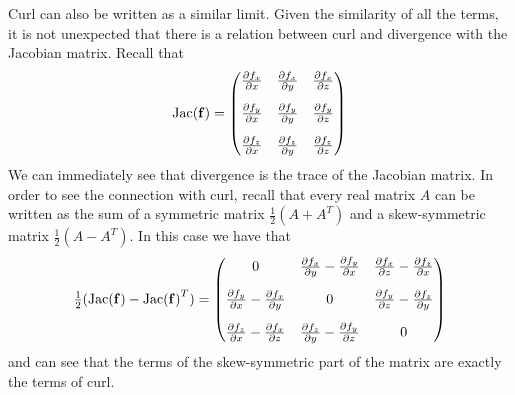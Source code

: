 Curl can also be written as a similar limit.
Given the similarity of all the terms, it is not unexpected that there is a relation between curl and divergence with the Jacobian matrix.
Recall that
\[
    \operatorname{Jac}(\mathbf{f}) =
    \begin{pmatrix}
        \frac{\partial f_x}{\partial x}
         & \frac{\partial f_x}{\partial y}
         & \frac{\partial f_x}{\partial z} \\[1em]
        \frac{\partial f_y}{\partial x}
         & \frac{\partial f_y}{\partial y}
         & \frac{\partial f_y}{\partial z} \\[1em]
        \frac{\partial f_z}{\partial x}
         & \frac{\partial f_z}{\partial y}
         & \frac{\partial f_z}{\partial z}
    \end{pmatrix}
\]
We can immediately see that divergence is the trace of the Jacobian matrix.
In order to see the connection with curl, recall that every real matrix \(A\) can be written as the sum of a symmetric matrix \(\frac{1}{2}(A + A^{T})\) and a skew-symmetric matrix \(\frac{1}{2}(A - A^{T})\).
In this case we have that
\[
    \tfrac{1}{2}(\operatorname{Jac}(\mathbf{f}) - {\operatorname{Jac}(\mathbf{f})}^{T}) =
    \begin{pmatrix}
        0
         & \frac{\partial f_x}{\partial y} - \frac{\partial f_y}{\partial x}
         & \frac{\partial f_x}{\partial z} - \frac{\partial f_z}{\partial x}
        \\[1em]
        \frac{\partial f_y}{\partial x} - \frac{\partial f_x}{\partial y}
         & 0
         & \frac{\partial f_y}{\partial z} - \frac{\partial f_z}{\partial y}
        \\[1em]
        \frac{\partial f_z}{\partial x}  - \frac{\partial f_x}{\partial z}
         & \frac{\partial f_z}{\partial y}  - \frac{\partial f_y}{\partial z}
         & 0
    \end{pmatrix}
\]
and can see that the terms of the skew-symmetric part of the matrix are exactly the terms of curl.
